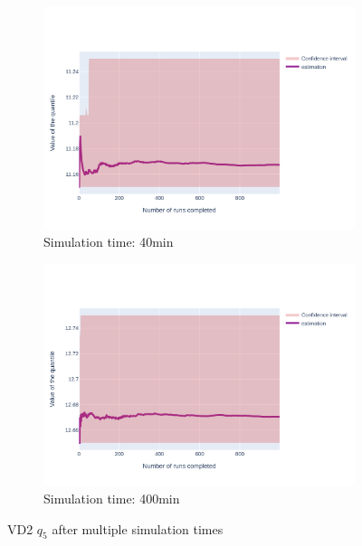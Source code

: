 \documentclass{article}
\begin{document}
\begin{figure}[H]
\begin{subfigure}{.495\textwidth}
    \end{subfigure}
    \begin{subfigure}{.495\textwidth}
        \centering
        \includegraphics[width=\textwidth]{../fig/quantile5/VD2_40mn.png}
        \caption{Simulation time: 40min}
    \end{subfigure}
    \begin{subfigure}{.495\textwidth}
        \centering
        \includegraphics[width=\textwidth]{../fig/quantile5/VD2_400mn.png}
        \caption{Simulation time: 400min}
    \end{subfigure}
    \caption{VD2 $q_5$ after multiple simulation times}
\end{figure}
\end{document}
